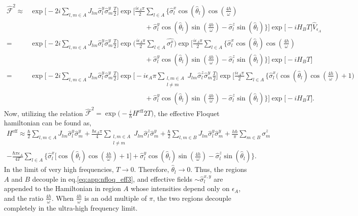 \documentclass[%
reprint,
superscriptaddress,
amsmath,amssymb,showkeys,
aps,
prb,
]{revtex4-2}
\begin{document}
	\begin{align}		
		\hat{\mathcal{F}}^2 	\approx& \exp\Bigg[-2i  \sum_{l,m\in A}J_{lm} \hat{\sigma}^y_l\hat{\sigma}^y_m\frac{T}{2}\Bigg]\exp\Bigg[\frac{i \epsilon_A \pi}{2}\sum_{l\in A}\Big\{\hat{\sigma}^x_l \cos(\hat{\theta}_l)\cos(\frac{4h}{\omega})\nonumber\\
		&\hspace{7cm}+ \hat{\sigma}^y_l \cos(\hat{\theta}_l)\sin(\frac{4h}{\omega})-\hat{\sigma}^z_l \sin(\hat{\theta}_l)\Big\}\Bigg] \exp\big[-i H_B T\big]\hat{V}_{\epsilon_A}\nonumber\\
		=&\exp\Bigg[-2i \sum_{l,m\in A}J_{lm} \hat{\sigma}_l^y\hat{\sigma}_m^y\frac{T}{2}\Bigg] \exp\Big(\frac{i\epsilon_A \pi}{2}\sum_{l\in A}\hat{\sigma^x_l}\Big) \exp\Bigg[\frac{i \epsilon_A \pi}{2}\sum_{l\in A}\Big\{\hat{\sigma}^x_l \cos(\hat{\theta}_l)\cos(\frac{4h}{\omega})\nonumber\\
		&\hspace{ 7cm}  +\hat{\sigma}^y_l \cos(\hat{\theta}_l)\sin(\frac{4h}{\omega})-\hat{\sigma}^z_l \sin(\hat{\theta}_l)\Big\}\Bigg]\exp\big[-i H_B T\big]\nonumber\\
		=&\exp\Bigg[-2i\sum_{l,m\in A}J_{lm}\hat{\sigma}^y_l\hat{\sigma}^y_m \frac{T}{2}\Bigg] \exp\Bigg[-i\epsilon_A \pi \sum_{\substack{l,m \in A\\l\neq m}}J_{lm} \hat{\sigma}^z_l\hat{\sigma}^y_m\frac{T}{2}\Bigg] \exp\Bigg[\frac{i \epsilon_A \pi}{2}\sum_{l\in A}\Bigg\{\hat{\sigma}^x_l\Bigg( \cos(\hat{\theta}_l)\cos(\frac{4h}{\omega})+1\Bigg)\nonumber\\
		&\hspace{7cm} +\hat{\sigma}^y_l \cos(\hat{\theta}_l)\sin(\frac{4h}{\omega})-\hat{\sigma}^z_l \sin(\hat{\theta}_l)\Bigg\}\Bigg] \exp\big[-i H_B T\big].
		\label{eq:floq_couple1}
	\end{align}
	Now, utilizing the relation $\displaystyle \hat{\mathcal{F}}^2 = \exp\Big(-\frac{i}{\hbar}H^{\mathrm{eff}}2T\Big)$, the effective Floquet hamiltonian can be found as,
	\begin{multline}
		H^{\mathrm{eff}} \approx\frac{\hbar}{2} \sum_{l,m\in A}J_{lm}\hat{\sigma}_l^y\hat{\sigma}_m^y +\frac{\hbar \epsilon_A \pi}{4} \sum_{\substack{l,m\in A\\l\neq m}} J_{lm}\hat{\sigma}^z_l\hat{\sigma}^y_m + \frac{\hbar}{2}\sum_{l,m\in B}J_{lm}\hat{\sigma}_l^y \hat{\sigma}_m^y + \frac{h\hbar}{\pi}\sum_{m \in B}\hat{\sigma}^z_m \\ -\frac{\hbar \pi \epsilon_A}{4T}\sum_{l\in A}\Bigg\{\hat{\sigma}^x_l \bigg[\cos(\hat{\theta}_l)\cos(\frac{4h}{\omega})+1 \bigg] + \hat{\sigma}^y_l \cos(\hat{\theta}_l)\sin(\frac{4h}{\omega})-\hat{\sigma}^z_l \sin(\hat{\theta}_l)\Bigg\}.
		\label{eq:app:nfloq_eff3}
	\end{multline}
	In the limit of very high frequencies, $T\rightarrow 0$. Therefore,  $\hat{\theta}_l \rightarrow 0$. Thus, the regions $A$ and $B$ decouple in eq.\eqref{eq:app:nfloq_eff3}, and effective fields $\sim \hat{\sigma}^{x,y}_l$ are appended to the Hamiltonian in region $A$ whose intensities depend only on $\epsilon_A$, and the ratio $\frac{4h}{\omega}$. When $\frac{4h}{\omega}$ is an odd multiple of $\pi$, the two regions decouple completely in the ultra-high frequency limit.
	
	
	
\end{document}
